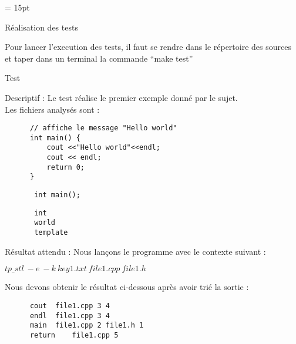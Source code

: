\documentclass{article}
\begin{document}
\newpage 
\oddsidemargin = 15pt
\begin{section}{Réalisation des tests}

Pour lancer l'execution des tests, il faut se rendre dans le répertoire des sources et taper dans un terminal la commande ``make test''
 \begin{subsection}{Test }
    \begin{paragraph}{Descriptif :}
      Le test  réalise le premier exemple donné par le sujet.\\ Les fichiers analysés sont : 
      
      \begin{listing}[h!]
      \begin{verbatim}
	  // affiche le message "Hello world"
	  int main() {
	      cout <<"Hello world"<<endl;
	      cout << endl;
	      return 0;
	  }
      \end{verbatim}
      \end{listing}
      
      \begin{listing}[h!]
	\begin{verbatim}
	   int main();
	\end{verbatim}
      \end{listing}
      
        \begin{listing}[h!]
	\begin{verbatim}
	   int
	   world
	   template
	\end{verbatim}
      \end{listing}
      
    \end{paragraph}
    
    \begin{paragraph}{Résultat attendu :} 
      Nous lançons le programme avec le contexte suivant :  
       \begin{center}
	\textbf{$tp\_stl\ -e\ -k\ key1.txt\ file1.cpp\ file1.h$}
      \end{center}
      
      Nous devons obtenir le résultat ci-dessous après avoir trié la sortie : 
      \begin{listing}[h!]
      \begin{verbatim}
	  cout	file1.cpp 3 4	
	  endl	file1.cpp 3 4	
	  main	file1.cpp 2	file1.h 1	
	  return	file1.cpp 5	
      \end{verbatim}
  

\end{listing}
\end{paragraph}
\end{subsection}
\end{section}
\end{document}
